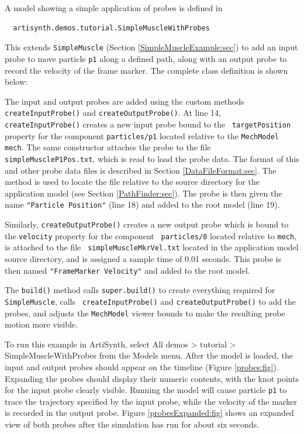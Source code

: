 A model showing a simple application of probes is defined in
%
\begin{verbatim}
  artisynth.demos.tutorial.SimpleMuscleWithProbes
\end{verbatim}
%
This extends {\tt SimpleMuscle} (Section
\ref{SimpleMuscleExample:sec}) to add an input probe to move particle
{\tt p1} along a defined path, along with an output probe to record
the velocity of the frame marker.  The complete class definition is
shown below:
%
\lstset{numbers=left}

\lstset{numbers=none}
%
The input and output probes are added using the custom methods {\tt
createInputProbe()} and {\tt createOutputProbe()}. At line 14, {\tt
createInputProbe()} creates a new input probe bound to the {\tt
targetPosition} property for the component {\tt particles/p1} located
relative to the {\tt MechModel} {\tt mech}. The same constructor
attaches the probe to the file\\ {\tt simpleMuscleP1Pos.txt}, which is
read to load the probe data. The format of this and other probe data
files is described in Section \ref{DataFileFormat:sec}.  The method
is used to locate the file relative to the source directory for the
application model (see Section
\ref{PathFinder:sec}). The probe is then given the name {\tt "Particle
Position"} (line 18) and added to the root model (line 19).

Similarly, {\tt createOutputProbe()} creates a new output probe which
is bound to the {\tt velocity} property for the component {\tt
particles/0} located relative to {\tt mech}, is attached to the file {\tt
simpleMuscleMkrVel.txt} located in the application model source
directory, and is assigned a sample time of 0.01 seconds. This probe is
then named {\tt "FrameMarker Velocity"} and added to the root model.

The {\tt build()} method calls {\tt super.build()} to create
everything required for {\tt SimpleMuscle}, calls {\tt
createInputProbe()} and {\tt createOutputProbe()} to add the probes,
and adjusts the {\tt MechModel} viewer bounds to make the resulting
probe motion more visible.

To run this example in ArtiSynth, select {\sf All demos > tutorial >
SimpleMuscleWithProbes} from the {\sf Models} menu. After the model is
loaded, the input and output probes should appear on the timeline
(Figure \ref{probes:fig}). Expanding the probes should display their
numeric contents, with the knot points for the input probe clearly
visible.  Running the model will cause particle {\tt p1} to trace the
trajectory specified by the input probe, while the velocity of the
marker is recorded in the output probe. Figure
\ref{probesExpanded:fig} shows an expanded view of both probes after
the simulation has run for about six seconds.

